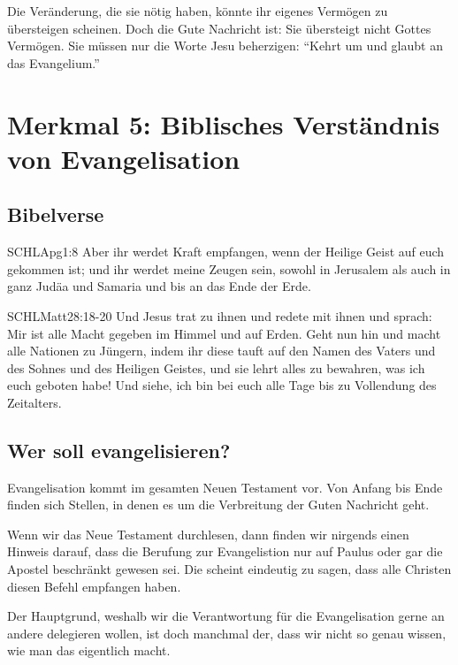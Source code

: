 \documentclass{../../inc/mybib}
\begin{document}
Die Veränderung, die sie nötig haben, könnte ihr eigenes Vermögen zu übersteigen scheinen. Doch die Gute Nachricht ist: Sie übersteigt nicht Gottes Vermögen. Sie müssen nur die Worte Jesu beherzigen: \enquote{Kehrt um und glaubt an das Evangelium.}

\section{Merkmal 5: Biblisches Verständnis von Evangelisation}
\subsection{Bibelverse}
\begin{bibelbox}{SCHL}{Apg}{1:8}
    Aber ihr werdet Kraft empfangen, wenn der Heilige Geist auf euch gekommen ist; und ihr werdet meine Zeugen sein, sowohl in Jerusalem als auch in ganz Judäa und Samaria und bis an das Ende der Erde.
\end{bibelbox}
\begin{bibelbox}{SCHL}{Matt}{28:18-20}
    Und Jesus trat zu ihnen und redete mit ihnen und sprach: Mir ist alle Macht gegeben im Himmel und auf Erden. Geht nun hin und macht alle Nationen zu Jüngern, indem ihr diese tauft auf den Namen des Vaters und des Sohnes und des Heiligen Geistes, und sie lehrt alles zu bewahren, was ich euch geboten habe! Und siehe, ich bin bei euch alle Tage bis zu Vollendung des Zeitalters.
\end{bibelbox}
\subsection{Wer soll evangelisieren? }
Evangelisation kommt im gesamten Neuen Testament vor. Von Anfang bis Ende finden sich Stellen, in denen es um die Verbreitung der Guten Nachricht geht.

Wenn wir das Neue Testament durchlesen, dann finden wir nirgends einen Hinweis darauf, dass die Berufung zur Evangelistion nur auf Paulus oder gar die Apostel beschränkt gewesen sei. Die scheint eindeutig zu sagen, dass alle Christen diesen Befehl empfangen haben.

Der Hauptgrund, weshalb wir die Verantwortung für die Evangelisation gerne an andere delegieren wollen, ist doch manchmal der, dass wir nicht so genau wissen, wie man das eigentlich macht.
\end{document}
